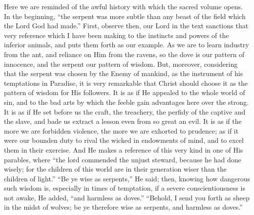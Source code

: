 Here we are reminded of the awful history with which the sacred
volume opens. In the beginning, ``the serpent was more subtle than
any beast of the field which the Lord God had made.'' First,
observe then, our Lord in the text sanctions that very reference which
I have been making to the instincts and powers of the inferior
animals, and puts them forth as our example. As we are to learn
industry from the ant, and reliance on Him from the ravens, so the
dove is our pattern of innocence, and the serpent our pattern of
wisdom. But, moreover, considering that the serpent was chosen by
the
Enemy of mankind, as the instrument of his temptations in Paradise, it
is very remarkable that Christ should choose it as the pattern of
wisdom for His followers. It is as if He appealed to the whole world
of sin, and to the bad arts by which the feeble gain advantages here
over the strong. It is as if He set before us the craft, the
treachery, the perfidy of the captive and the slave, and bade us
extract a lesson even from so great an evil. It is as if the more we
are forbidden violence, the more we are exhorted to prudence; as if it
were our bounden duty to rival the wicked in endowments of mind, and
to excel them in their exercise. And He makes a reference of this very
kind in one of His parables, where ``the lord commended the unjust
steward, because he had done wisely; for the children of this world
are in their generation wiser than the children of light.''
``Be ye wise as serpents,'' He said; then, knowing how
dangerous such wisdom is, especially in times of temptation, if a
severe conscientiousness is not awake, He added, ``and harmless as
doves.'' ``Behold, I send you forth as sheep in the midst of
wolves; be ye therefore wise as serpents, and harmless as doves.''

